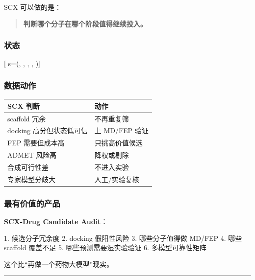 \documentclass[
  12pt,
]{ctexart}
\newenvironment{Shaded}{}{}
\newcommand{\NormalTok}[1]{#1}
\begin{document}
SCX 可以做的是：

\begin{quote}
\textbf{判断哪个分子在哪个阶段值得继续投入。}
\end{quote}

\subsubsection{状态}\label{ux72b6ux6001}

{[} s=(, , ,
, ){]}

\subsubsection{数据动作}\label{ux6570ux636eux52a8ux4f5c}

\begin{longtable}[]{@{}ll@{}}
\toprule\noalign{}
SCX 判断 & 动作 \\
\midrule\noalign{}
\endhead
\bottomrule\noalign{}
\endlastfoot
scaffold 冗余 & 不再重复筛 \\
docking 高分但状态低可信 & 上 MD/FEP 验证 \\
FEP 需要但成本高 & 只挑高价值候选 \\
ADMET 风险高 & 降权或剔除 \\
合成可行性差 & 不进入实验 \\
专家模型分歧大 & 人工/实验复核 \\
\end{longtable}

\subsubsection{最有价值的产品}\label{ux6700ux6709ux4ef7ux503cux7684ux4ea7ux54c1}

\textbf{SCX-Drug Candidate Audit}：

\begin{Shaded}
\begin{Highlighting}[]
\NormalTok{1. 候选分子冗余度}
\NormalTok{2. docking 假阳性风险}
\NormalTok{3. 哪些分子值得做 MD/FEP}
\NormalTok{4. 哪些 scaffold 覆盖不足}
\NormalTok{5. 哪些预测需要湿实验验证}
\NormalTok{6. 多模型可靠性矩阵}
\end{Highlighting}
\end{Shaded}

这个比``再做一个药物大模型''现实。

\begin{center}\rule{0.5\linewidth}{0.5pt}\end{center}
\end{document}
